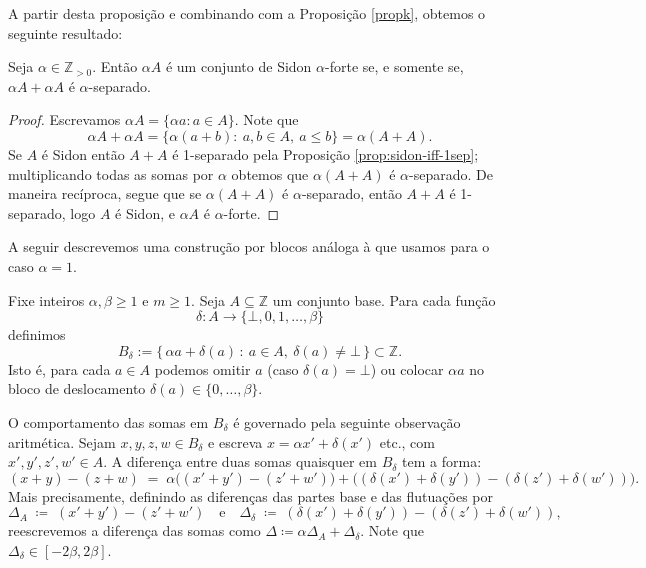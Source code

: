 \documentclass[reqno,a4paper,12pt]{amsart}
\begin{document}
A partir desta proposição e combinando com a Proposição \ref{propk}, obtemos o seguinte resultado:

\begin{proposition}\label{prop:scaling-alpha}
  Seja \(\alpha\in\mathbb Z_{>0}\). Então \(\alpha A\) é um conjunto de Sidon \(\alpha\)-forte
  se, e somente se, \(\alpha A+\alpha A\) é \(\alpha\)-separado.
\end{proposition}

\begin{proof}
  Escrevamos \(\alpha A=\{\alpha a: a\in A\}\). Note que
  \[
    \alpha A + \alpha A = \{\alpha(a+b):\ a,b\in A,\ a\le b\} = \alpha(A+A).
  \]
  Se \(A\) é Sidon então \(A+A\) é 1-separado pela Proposição \ref{prop:sidon-iff-1sep}; multiplicando todas as somas por \(\alpha\) obtemos que \(\alpha(A+A)\) é \(\alpha\)-separado. De maneira recíproca, segue que se \(\alpha(A+A)\) é \(\alpha\)-separado, então \(A+A\) é 1-separado, logo \(A\) é Sidon, e \(\alpha A\) é \(\alpha\)-forte.
\end{proof}

A seguir descrevemos uma construção por blocos análoga à que usamos para o caso \(\alpha=1\).

\begin{definition}
  \label{defbdelta}
  Fixe inteiros \(\alpha,\beta\ge 1\) e \(m\ge1\). Seja \(A\subseteq\mathbb Z\) um conjunto base.
  Para cada função
  \[
    \delta: A \longrightarrow \{\bot,0,1,\dots,\beta\}
  \]
  definimos
  \[
    B_{\delta}:=\{\,\alpha a + \delta(a)\,:\ a\in A,\ \delta(a)\neq\bot\,\}\subset\mathbb Z.
  \]
  Isto é, para cada \(a\in A\) podemos omitir \(a\) (caso \(\delta(a)=\bot\)) ou colocar \(\alpha a\)
  no bloco de deslocamento \(\delta(a)\in\{0,\dots,\beta\}\).
\end{definition}

O comportamento das somas em $B_{\delta}$ é governado pela seguinte observação aritmética. Sejam $x,y,z,w \in B_{\delta}$ e escreva $x = \alpha x'+\delta(x')$ etc., com $x',y',z',w' \in A$.
A diferença entre duas somas quaisquer em $B_\delta$ tem a forma:
\[
  (x+y)-(z+w) \;=\; \alpha\bigl((x'+y')-(z'+w')\bigr) + \bigl((\delta(x')+\delta(y'))-(\delta(z')+\delta(w'))\bigr).
\]
Mais precisamente, definindo as diferenças das partes base e das flutuações por
\[
  \Delta_A \;\coloneqq\; (x'+y') - (z'+w') \quad\text{e}\quad \Delta_\delta \;\coloneqq\; (\delta(x')+\delta(y')) - (\delta(z')+\delta(w')),
\]
reescrevemos a diferença das somas como $\Delta \coloneqq \alpha\Delta_A + \Delta_\delta$. Note que $\Delta_\delta \in [-2\beta, 2\beta]$.
\end{document}
